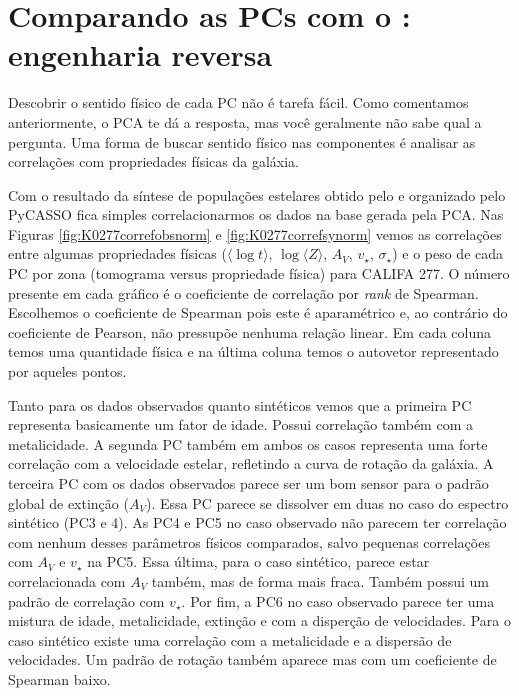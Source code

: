 \section{Comparando as PCs com o \STARLIGHT: engenharia reversa}
\label{sec:PCAaplic:EngRev}

Descobrir o sentido físico de cada PC não é tarefa fácil. Como comentamos anteriormente, o PCA te dá a resposta, mas
você geralmente não sabe qual a pergunta. Uma forma de buscar sentido físico nas componentes é analisar as correlações
com propriedades físicas da galáxia.

Com o resultado da síntese de populações estelares obtido pelo \starlight e organizado pelo PyCASSO fica simples
correlacionarmos os dados na base gerada pela PCA. Nas Figuras \ref{fig:K0277correfobsnorm} e
\ref{fig:K0277correfsynorm} vemos as correlações entre algumas propriedades físicas ($\langle\log t \rangle$, $\log
\langle Z \rangle$, $A_V$, $v_{\star}$, $\sigma_{\star}$) e o peso de cada PC por zona (tomograma versus propriedade
física) para CALIFA 277. O número presente em cada gráfico é o coeficiente de correlação por {\em rank} de Spearman.
Escolhemos o coeficiente de Spearman pois este é aparamétrico e, ao contrário do coeficiente de Pearson, não pressupõe
nenhuma relação linear. Em cada coluna temos uma quantidade física e na última coluna temos o autovetor representado por
aqueles pontos.

Tanto para os dados observados quanto sintéticos vemos que a primeira PC representa basicamente um fator de idade.
Possui correlação também com a metalicidade. A segunda PC também em ambos os casos representa uma forte correlação com a
velocidade estelar, refletindo a curva de rotação da galáxia. A terceira PC com os dados observados parece ser um bom
sensor para o padrão global de extinção ($A_V$). Essa PC parece se dissolver em duas no caso do espectro sintético (PC3
e 4). As PC4 e PC5 no caso observado não parecem ter correlação com nenhum desses parâmetros físicos comparados, salvo
pequenas correlações com $A_V$ e $v_\star$ na PC5. Essa última, para o caso sintético, parece estar correlacionada com
$A_V$ também, mas de forma mais fraca. Também possui um padrão de correlação com $v_\star$. Por fim, a PC6 no caso
observado parece ter uma mistura de idade, metalicidade, extinção e com a disperção de velocidades. Para o caso
sintético existe uma correlação com a metalicidade e a dispersão de velocidades. Um padrão de rotação também aparece mas
com um coeficiente de Spearman baixo.

